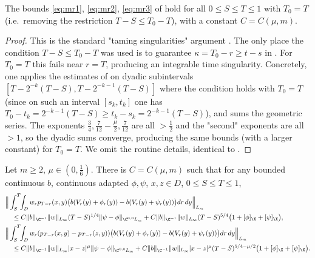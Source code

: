 \begin{corollary}\label{c:39}
The bounds \eqref{eq:mr1}, \eqref{eq:mr2}, \eqref{eq:mr3} of  hold for all $0\le S\le T\le1$ with $T_0=T$ (i.e.\ removing the restriction $T-S\le T_0-T$), with a constant $C=C(\mu,m)$.
\end{corollary}

\begin{proof}
This is the standard "taming singularities" argument \cite[Lemma 2.3]{BFG}. The only place the condition $T-S\le T_0-T$ was used is to guarantee $\kappa=T_0-r\ge t-s$ in . For $T_0=T$ this fails near $r=T$, producing an integrable time singularity. Concretely, one applies the estimates of  on dyadic subintervals $[T-2^{-k}(T-S),T-2^{-k-1}(T-S)]$ where the condition holds with $T_0=T$ (since on such an interval $[s_k,t_k]$ one has $T_0-t_k=2^{-k-1}(T-S)\ge t_k-s_k=2^{-k-1}(T-S)$), and sums the geometric series. The exponents $\tfrac34,\tfrac7{12}-\tfrac\mu2,\tfrac7{12}$ are all $>\tfrac12$ and the "second" exponents are all $>1$, so the dyadic sums converge, producing the same bounds (with a larger constant) for $T_0=T$. We omit the routine details, identical to \cite[Lemma 2.3]{BFG}.
\end{proof}

\begin{corollary}\label{c:310}
Let $m\ge2$, $\mu\in(0,\tfrac16)$. There is $C=C(\mu,m)$ such that for any bounded continuous $b$, continuous adapted $\phi,\psi$, $x,z\in D$, $0\le S\le T\le1$,
\begin{align}
&\Big\|\int_S^T\!\!\int_D w_r p_{T-r}(x,y)\big(b(V_r(y)+\phi_r(y))-b(V_r(y)+\psi_r(y))\big)dr\,dy\Big\|_{L_m}\nonumber\\
&\quad\le C\|b\|_{\C^{-1}}\|w\|_{L_\infty}(T-S)^{1/4}\|\psi-\phi\|_{\C^{0,0}L_m}+C\|b\|_{\C^{-1}}\|w\|_{L_\infty}(T-S)^{5/4}\big(1+[\phi]_\X+[\psi]_\X\big),\label{eq:c310a}\\
&\Big\|\int_S^T\!\!\int_D w_r(p_{T-r}(x,y)-p_{T-r}(z,y))\big(b(V_r(y)+\phi_r(y))-b(V_r(y)+\psi_r(y))\big)dr\,dy\Big\|_{L_m}\nonumber\\
&\quad\le C\|b\|_{\C^{-1}}\|w\|_{L_\infty}|x-z|^\mu\|\psi-\phi\|_{\C^{0,0}L_m}+C\|b\|_{\C^{-1}}\|w\|_{L_\infty}|x-z|^\mu(T-S)^{5/4-\mu/2}\big(1+[\phi]_\X+[\psi]_\X\big).\label{eq:c310b}
\end{align}
\end{corollary}


